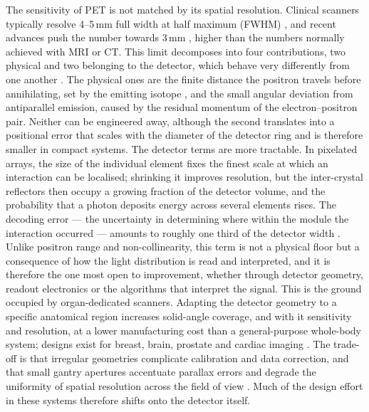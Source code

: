 \documentclass[10pt,conference]{IEEEtran}
\begin{document}
The sensitivity of PET is not matched by its spatial resolution. Clinical
scanners typically resolve 4--5\,mm full width at half maximum
(FWHM) \cite{spencer2021}, and
recent advances push the number towards 3\,mm \cite{spencer2021,
gonzalezmontoro2022brain}, higher than the numbers normally achieved with MRI or CT. This limit decomposes into four
contributions, two physical and two belonging to the detector, which behave
very differently from one another \cite{moses2011}. The physical ones are
the finite distance the positron travels before annihilating, set by the
emitting isotope \cite{levin1999}, and the small angular deviation from
antiparallel emission, caused by the residual momentum of the
electron--positron pair. Neither can be engineered away, although the second
translates into a positional error that scales with the diameter of the
detector ring and is therefore smaller in compact systems. The detector terms are more tractable. In pixelated arrays, the size of the
individual element fixes the finest scale at which an interaction can be
localised; shrinking it improves resolution, but the inter-crystal
reflectors then occupy a growing fraction of the detector volume, and the
probability that a photon deposits energy across several elements rises.
The decoding error --- the uncertainty in determining where within the
module the interaction occurred --- amounts to roughly one third of the
detector width \cite{moses2011}. Unlike positron range and non-collinearity,
this term is not a physical floor but a consequence of how the light
distribution is read and interpreted, and it is therefore the one most open to improvement, whether through detector geometry, readout electronics or the algorithms that interpret
the signal.
This is the ground occupied by organ-dedicated scanners. Adapting the
detector geometry to a specific anatomical region increases solid-angle
coverage, and with it sensitivity and resolution, at a lower manufacturing
cost than a general-purpose whole-body system; designs exist for breast,
brain, prostate and cardiac imaging \cite{sanaat2024}. The trade-off is that
irregular geometries complicate calibration and data correction, and that
small gantry apertures accentuate parallax errors and degrade the uniformity
of spatial resolution across the field of view \cite{sanaat2024}. Much of
the design effort in these systems therefore shifts onto the detector
itself.
\end{document}
